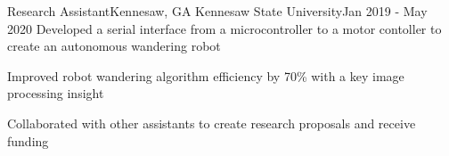 \resumeSubheading
{Research Assistant}{Kennesaw, GA}
{Kennesaw State University}{Jan 2019 - May 2020}
\resumeItemListStart
\resumeItem
{
    Developed a serial interface from a microcontroller to a motor contoller
    to create an autonomous wandering robot
}

\resumeItem
{
    Improved robot wandering algorithm efficiency by 70\% with a key image processing insight
}

\resumeItem
{
    Collaborated with other assistants to create research proposals and receive funding
}
\resumeItemListEnd

